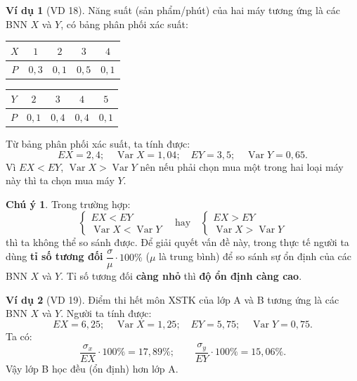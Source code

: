 \documentclass[12pt,a4paper]{article}
\theoremstyle{definition}
\newtheorem{vidu}{Ví dụ}[section]
\newtheorem{chuy}{Chú ý}[section]
\begin{document}
\begin{vidu}[VD 18]
Năng suất (sản phẩm/phút) của hai máy tương ứng là các BNN $X$ và $Y$, có bảng phân phối xác suất:
\begin{center}
\begin{tabular}{|c|c|c|c|c|}
\hline
$X$ & $1$ & $2$ & $3$ & $4$ \\
\hline
$P$ & $0{,}3$ & $0{,}1$ & $0{,}5$ & $0{,}1$ \\
\hline
\end{tabular}
\qquad
\begin{tabular}{|c|c|c|c|c|}
\hline
$Y$ & $2$ & $3$ & $4$ & $5$ \\
\hline
$P$ & $0{,}1$ & $0{,}4$ & $0{,}4$ & $0{,}1$ \\
\hline
\end{tabular}
\end{center}
Từ bảng phân phối xác suất, ta tính được:
\[
EX = 2{,}4; \quad \operatorname{Var} X = 1{,}04; \quad EY = 3{,}5; \quad \operatorname{Var} Y = 0{,}65.
\]
Vì $EX < EY$, $\operatorname{Var} X > \operatorname{Var} Y$ nên nếu phải chọn mua một trong hai loại máy này thì ta chọn mua máy $Y$.
\end{vidu}

\begin{chuy}
Trong trường hợp:
\[
\begin{cases}
EX < EY \\
\operatorname{Var} X < \operatorname{Var} Y
\end{cases}
\quad \text{hay} \quad
\begin{cases}
EX > EY \\
\operatorname{Var} X > \operatorname{Var} Y
\end{cases}
\]
thì ta không thể so sánh được. Để giải quyết vấn đề này, trong thực tế người ta dùng \textbf{tỉ số tương đối} $\dfrac{\sigma}{\mu} \cdot 100\%$ ($\mu$ là trung bình) để so sánh sự ổn định của các BNN $X$ và $Y$. Tỉ số tương đối \textbf{càng nhỏ} thì \textbf{độ ổn định càng cao}.
\end{chuy}

\begin{vidu}[VD 19]
Điểm thi hết môn XSTK của lớp A và B tương ứng là các BNN $X$ và $Y$. Người ta tính được:
\[
EX = 6{,}25; \quad \operatorname{Var} X = 1{,}25; \quad EY = 5{,}75; \quad \operatorname{Var} Y = 0{,}75.
\]
Ta có:
\[
\frac{\sigma_x}{EX} \cdot 100\% = 17{,}89\%; \qquad \frac{\sigma_y}{EY} \cdot 100\% = 15{,}06\%.
\]
Vậy lớp B học đều (ổn định) hơn lớp A.
\end{vidu}
\end{document}
